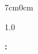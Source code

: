 
\begin{center}
  
  {\MakeUppercase{\meuautor}}
  
  \vspace{9cm}
  
  {\bfseries\MakeUppercase{\meutitulo}%
  \ifdefempty{\meusubtitulo}{}{: \meusubtitulo}
  }
  
  \vspace{2cm}
  
  \begin{adjustwidth}{7cm}{0cm}
    \begin{spacing}{1.0}
      \textopresentacao
      
      \vspace{0.5cm}
      
      {\noindent\textbf{\titulacaoorientador:} \meuorientador} \\
      \ifdefempty{\meucoorientador}{}{%
        {\noindent\textbf{\titulacaocoorientador:} \meucoorientador}
      }
    \end{spacing}
  \end{adjustwidth}
  
  \vfill
  
  {\meulocal} \\
  {\meuano}

\end{center}

